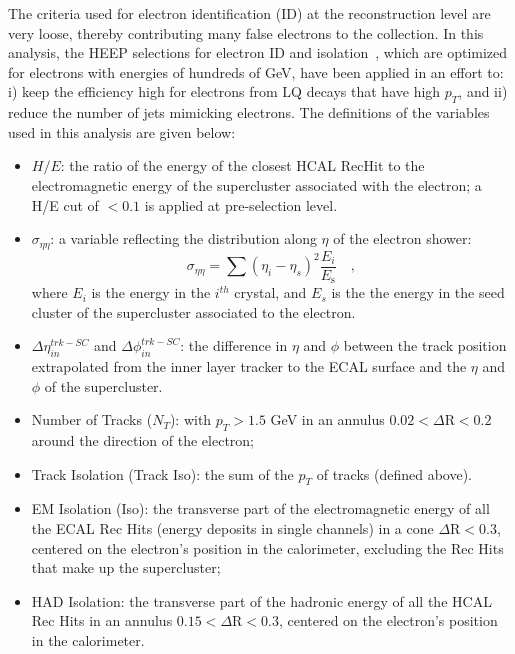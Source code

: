 The criteria used for electron identification (ID) at the reconstruction level are very loose, thereby contributing many false electrons 
to the collection. In this analysis, the HEEP selections for electron ID and isolation~\cite{HEEPNOTE}, which are optimized for 
electrons with energies of hundreds of GeV, have been applied in an effort to: i) keep the efficiency high for electrons 
from LQ decays that have high $p_{T}$, and ii) reduce the number of jets mimicking electrons.
The definitions of the variables used in this analysis are given below:
%
\begin{itemize}
%
\item $H/E$: the ratio of the energy of the closest HCAL RecHit to the electromagnetic energy of 
the supercluster associated with the electron; a H/E cut of $<0.1$ is applied at pre-selection level.
%
\item $\sigma_{\eta\eta}$: a variable reflecting the distribution along $\eta$ of the electron shower:
\begin{displaymath}
\sigma_{\eta\eta} = \sum( \eta_i - \eta_s )^2 \frac{E_i}{E_{\mbox{s}}} \quad ,
\end{displaymath}
where $E_i$ is the energy in the $i^{th}$ crystal, and $E_s$ is the the energy in the seed cluster of the supercluster associated to the electron.
%
\item $\Delta\eta_{in}^{trk-SC}$ and $\Delta\phi_{in}^{trk-SC}$: the difference in $\eta$ and $\phi$ between the track position extrapolated from 
the inner layer tracker to the ECAL surface and the $\eta$ and $\phi$ of the supercluster.
%
\item Number of Tracks ($N_T$): with $p_{T}>1.5$ GeV in an annulus $0.02 < \Delta\mbox{R} < 0.2 $ around the direction of the electron;
%
\item Track Isolation (Track Iso): the sum of the $p_{T}$ of tracks (defined above).
%
%
\item EM Isolation (Iso): the transverse part of the electromagnetic energy 
of all the ECAL Rec Hits (energy deposits in single channels)
in a cone $\Delta\mbox{R} < 0.3$, 
centered on the electron's position in the calorimeter, excluding the Rec Hits that make up the supercluster;
%
\item HAD Isolation: the transverse part of the hadronic energy of all the HCAL Rec Hits in an annulus
$0.15 < \Delta\mbox{R} < 0.3$, centered on the electron's position in the calorimeter. 
%
\end{itemize}

